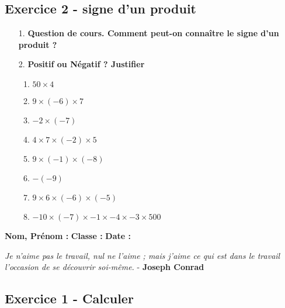 \subsection*{Exercice 2 - signe d'un produit}

\begin{enumerate}
    \item[1.] \textbf{Question de cours. Comment peut-on connaître le signe d'un produit ?} \\
    \Pointilles[3]

    \item[2.] \textbf{Positif ou Négatif ? Justifier} 
    \begin{enumerate}
        \item $50 \times 4$ \dotfill
        \item $9 \times (-6) \times 7$ \dotfill
        \item $-2 \times (-7)$ \dotfill
        \item $4 \times 7 \times (-2) \times 5$ \dotfill
        \item $9 \times (-1) \times (-8)$ \dotfill
        \item $ -(-9)$ \dotfill
        \item $9 \times 6 \times (-6) \times (-5)$ \dotfill
        \item $-10 \times (-7) \times -1 \times - 4 \times -3 \times 500$ \dotfill
    \end{enumerate}
\end{enumerate}

\newpage

\textbf{Nom, Prénom :} \hspace{8cm} \textbf{Classe :} \hspace{3cm} \textbf{Date :}\\
\vspace{-0.8cm}
\begin{center}
  \textit{Je n'aime pas le travail, nul ne l'aime ; mais j'aime ce qui est dans le travail l'occasion de se découvrir soi-même.}  - \textbf{Joseph Conrad}
\end{center}
\vspace{-0.8cm}

\subsection*{Exercice 1 - Calculer}

